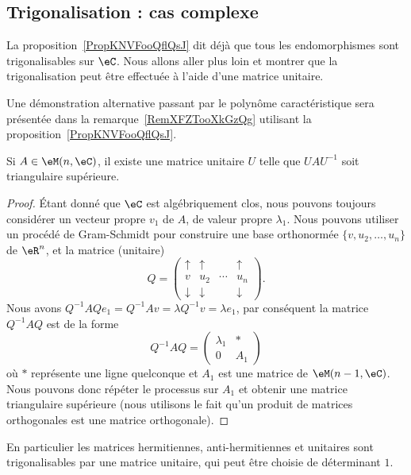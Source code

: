 \subsection{Trigonalisation : cas complexe}

La proposition~\ref{PropKNVFooQflQsJ} dit déjà que tous les endomorphismes sont trigonalisables sur \( \eC\). Nous allons aller plus loin et montrer que la trigonalisation peut être effectuée à l'aide d'une matrice unitaire.

Une démonstration alternative passant par le polynôme caractéristique sera présentée dans la remarque~\ref{RemXFZTooXkGzQg} utilisant la proposition~\ref{PropKNVFooQflQsJ}.
\begin{lemma}  \label{LemSchurComplHAftTq}
    Si \( A\in\eM(n,\eC)\), il existe une matrice unitaire \( U\) telle que \( UAU^{-1}\) soit triangulaire supérieure.
\end{lemma}

\begin{proof}
    Étant donné que \( \eC\) est algébriquement clos, nous pouvons toujours considérer un vecteur propre \( v_1\) de \( A\), de valeur propre \( \lambda_1\). Nous pouvons utiliser un procédé de Gram-Schmidt pour construire une base orthonormée \( \{ v,u_2,\ldots, u_n \}\) de \( \eR^n\), et la matrice (unitaire)
    \begin{equation}
        Q=\begin{pmatrix}
             \uparrow   &   \uparrow    &       &   \uparrow    \\
             v   &   u_2    &   \cdots    &   u_n    \\
             \downarrow   &   \downarrow    &       &   \downarrow
         \end{pmatrix}.
    \end{equation}
    Nous avons \( Q^{-1}AQe_1=Q^{-1} Av=\lambda Q^{-1} v=\lambda e_1\), par conséquent la matrice \( Q^{-1} AQ\) est de la forme
    \begin{equation}
        Q^{-1}AQ=\begin{pmatrix}
            \lambda_1    &   *    \\
            0    &   A_1
        \end{pmatrix}
    \end{equation}
    où \( *\) représente une ligne quelconque et \( A_1\) est une matrice de \( \eM(n-1,\eC)\). Nous pouvons donc répéter le processus sur \( A_1\) et obtenir une matrice triangulaire supérieure (nous utilisons le fait qu'un produit de matrices orthogonales est une matrice orthogonale).
\end{proof}
En particulier les matrices hermitiennes, anti-hermitiennes et unitaires sont trigonalisables par une matrice unitaire, qui peut être choisie de déterminant \( 1\).

